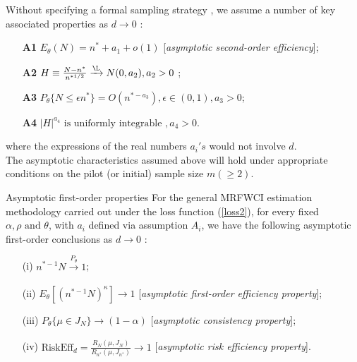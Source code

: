 \documentclass [xcolor=svgnames, t] {beamer}
\begin{document}
\begin{frame}{}
\vspace{15mm}
 Without specifying a formal sampling strategy , we assume a number of key associated properties as $d \xrightarrow{} 0$ :
   
    \begin{itemize}
        \item[\textbf{A1}] $ E_{\theta}(N)=n^* +a_1 +o(1)$ [\textit{asymptotic second-order efficiency}];
         \item[\textbf{A2}] $H \equiv \frac{N-n^*}{n^{*1/2}} \xrightarrow{\L} N(0,a_2), a_2>0$ ;
          \item[\textbf{A3}] $P_{\theta}\{ N \le \epsilon n^*\}=O(n^{*-a_3}),\epsilon \in (0,1), a_3>0$;
           \item[\textbf{A4}] $|H|^{a_4} \text{ is uniformly integrable },a_4 >0$.
    \end{itemize}
    
    where the expressions of the real numbers $a_i's$ would not involve $d$.\\
    \vspace{0.2cm}
    The asymptotic characteristics assumed above will hold under appropriate conditions on the pilot (or initial) sample size $m( \geq 2)$.
\end{frame}
\begin{frame}{Asymptotic first-order properties}
\vspace{7mm}
For the general MRFWCI estimation methodology carried out under the loss function (\ref{loss2}), for every fixed $\alpha, \rho \text{ and }
 \theta$, with $a_i$ defined via assumption $A_i$, we have the following asymptotic first-order conclusions as $d \xrightarrow{} 0$ :

\begin{itemize}
\item[(i)] $n^{*-1}N \xrightarrow[]{P_{\theta}}1$;
\item[(ii)] $E_{\theta}[(n^{*-1}N)^{\kappa}] \xrightarrow[]{} 1$ [\textit{asymptotic first-order efficiency property}];
\item[(iii)] $P_{\theta} \{ \mu \in J_N\} \xrightarrow[]{} (1-\alpha)$ [\textit{asymptotic consistency property}];
\item[(iv)] $\text{RiskEff}_d =\frac{R_N(\mu,J_N)}{R_{n^*}(\mu,J_{n^*})} \xrightarrow[]{} 1$ [\textit{asymptotic risk efficiency property}].
\end{itemize}
 
\end{frame}
\end{document}
